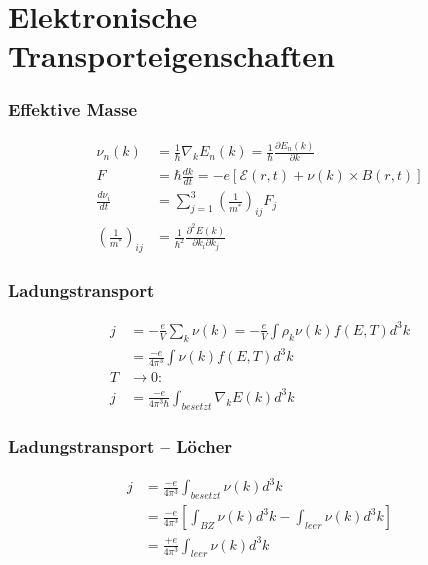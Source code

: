 \section{Elektronische Transporteigenschaften}


\subsubsection*{Effektive Masse}

\begin{equation*}
    \begin{aligned}
        \nu_n(k) &= \frac{1}{\hbar} \nabla_k E_n(k) = \frac{1}{\hbar} \frac{\partial E_n(k)}{\partial k} \\
        F &= \hbar \frac{dk}{dt} = -e \left[\mathcal{E}(r,t) + \nu (k) \times B(r,t)\right] \\
        \frac{d \nu_i}{dt} &= \sum_{j=1}^3 \left(\frac{1}{m^*}\right)_{ij} F_j \\
        \left(\frac{1}{m^*}\right)_{ij} &= \frac{1}{\hbar^2} \frac{\partial^2 E(k)}{\partial k_i \partial k_j}
    \end{aligned}
\end{equation*}


\subsubsection*{Ladungstransport}
\begin{equation*}
    \begin{aligned}
        j &= - \frac{e}{V} \sum_k \nu(k) = - \frac{e}{V} \int \rho_k \nu (k) f(E,T) d^3k \\
            &= \frac{-e}{4 \pi^3} \int \nu (k) f(E,T) d^3k \\
        T &\rightarrow 0: \\
        j &= \frac{-e}{4 \pi^3 \hbar} \int_{besetzt} \nabla_k E(k) d^3k
    \end{aligned}
\end{equation*}

\subsubsection*{Ladungstransport – Löcher}

\begin{equation*}
    \begin{aligned}
        j &= \frac{-e}{4 \pi^3} \int_{besetzt} \nu(k) d^3k \\
          &= \frac{-e}{4 \pi^3} \left[\int_{BZ} \nu(k) d^3 k - \int_{leer} \nu(k) d^3k\right] \\
          &= \frac{+e}{4 \pi^3} \int_{leer} \nu(k) d^3k
    \end{aligned}
\end{equation*}

